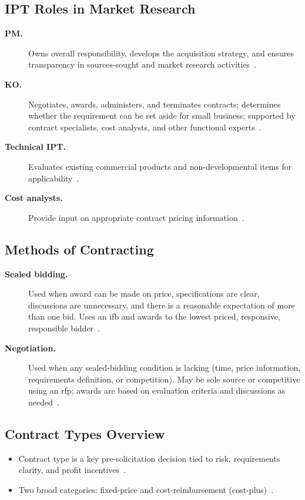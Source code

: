 \documentclass[../main.tex]{subfiles}
\begin{document}
\subsection{IPT Roles in Market Research}
\begin{description}
  \item[\textbf{PM.}] Owns overall responsibility, develops the acquisition strategy, and ensures transparency in sources-sought and market research activities~\autocite{edo-3-2-2-solicitation-prep-2025}.
  \item[\textbf{KO.}] Negotiates, awards, administers, and terminates contracts; determines whether the requirement can be set aside for small business; supported by contract specialists, cost analysts, and other functional experts~\autocite{edo-3-2-2-solicitation-prep-2025}.
  \item[\textbf{Technical IPT.}] Evaluates existing commercial products and non-developmental items for applicability~\autocite{edo-3-2-2-solicitation-prep-2025}.
  \item[\textbf{Cost analysts.}] Provide input on appropriate contract pricing information~\autocite{edo-3-2-2-solicitation-prep-2025}.
\end{description}

\subsection{Methods of Contracting}
\begin{description}
  \item[\textbf{Sealed bidding.}] Used when award can be made on price, specifications are clear, discussions are unnecessary, and there is a reasonable expectation of more than one bid. Uses an \ac{ifb} and awards to the lowest priced, responsive, responsible bidder~\autocite{edo-3-2-2-solicitation-prep-2025}.
  \item[\textbf{Negotiation.}] Used when any sealed-bidding condition is lacking (time, price information, requirements definition, or competition). May be sole source or competitive using an \ac{rfp}; awards are based on evaluation criteria and discussions as needed~\autocite{edo-3-2-2-solicitation-prep-2025}.
\end{description}

\subsection{Contract Types Overview}
\begin{itemize}
  \item Contract type is a key pre-solicitation decision tied to risk, requirements clarity, and profit incentives~\autocite{edo-3-2-2-solicitation-prep-2025,FAR-16-103-Negotiating-Contract-Type}.
  \item Two broad categories: fixed-price and cost-reimbursement (cost-plus)~\autocite{edo-3-2-2-solicitation-prep-2025,FAR-16-102-Contract-Type-Policies,FAR-16-202-1-FFP,FAR-16-301-1-Cost-Reimbursement}.
\end{itemize}
\end{document}
